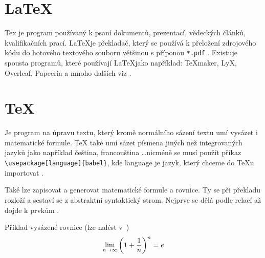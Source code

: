 \documentclass[a4paper,11pt]{article}
\begin{document}
\section{{\LaTeX}}
Tex je program používaný k psaní dokumentů, prezentací, vědeckých článků, kvalifikačních prací. \LaTeX je překladač, který se používá k přeložení zdrojového kódu do hotového textového souboru většinou s příponou \texttt{*.pdf} \cite{PavelBOJKO}. Existuje spousta programů, které používají \LaTeX jako například: {\TeX}maker, LyX, Overleaf, Papeeria a mnoho dalších viz \cite{BestLatexEditors}.


\section{{\TeX}}
Je program na úpravu textu, který kromě normálního sázení textu umí vysázet i matematické formule. {\TeX} také umí sázet písmena jiných než integrovaných jazyků jako například čeština, francouština \dots nicméně se musí použít příkaz \texttt{{\textbackslash}usepackage[language]\{babel\}}, kde language je jazyk, který chceme do {\TeX}u importovat \cite{PetrOlsak}.
\par
Také lze zapisovat a generovat matematické formule a rovnice. Ty se při překladu rozloží a sestaví se z abstraktní syntaktický strom. Nejprve se dělá podle relací až dojde k prvkům \cite{conferenc}.
\par
Příklad vysázené rovnice (lze nalést v~\cite{JiriKosek})
$$ \lim_{n \rightarrow \infty} \left(1 + {1 \over n} \right)^n = e $$


\newpage


\end{document}
